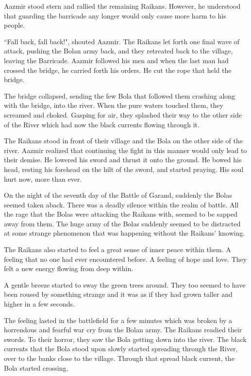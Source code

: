 \documentclass[twoside,11pt,titlepage]{article}
\begin{document}
Aazmir stood stern and rallied the remaining Raikans. However, he understood that guarding the barricade any longer would only cause more harm to his people.

``Fall back, fall back!", shouted Aazmir. The Raikans let forth one final wave of attack, pushing the Bolan army back, and they retreated back to the village, leaving the Barricade. Aazmir followed his men and when the last man had crossed the bridge, he carried forth his orders. He cut the rope that held the bridge.

The bridge collapsed, sending the few Bola that followed them crashing along with the bridge, into the river. When the pure waters touched them, they screamed and choked. Gasping for air, they splashed their way to the other side of the River which had now the black currents flowing through it.

The Raikans stood in front of their village and the Bola on the other side of the river. Aazmir realized that continuing the fight in this manner would only lead to their demise. He lowered his sword and thrust it onto the ground. He bowed his head, resting his forehead on the hilt of the sword, and started praying. His soul hurt now, more than ever.

On the night of the seventh day of the Battle of Garand, suddenly the Bolas seemed taken aback. There was a deadly silence within the realm of battle. All the rage that the Bolas were attacking the Raikans with, seemed to be sapped away from them. The huge army of the Bolas suddenly seemed to be distracted at some strange phenomenon that was happening without the Raikans' knowing.

The Raikans also started to feel a great sense of inner peace within them. A feeling that no one had ever encountered before. A feeling of hope and love. They felt a new energy flowing from deep within.

A gentle breeze started to sway the green trees around. They too seemed to have been roused by something strange and it was as if they had grown taller and higher in a few seconds.

The feeling lasted in the battlefield for a few minutes which was broken by a horrendous and fearful war cry from the Bolan army. The Raikans readied their swords. To their horror, they saw the Bola getting down into the river. The black currents that the Bola stood upon slowly started spreading through the River, over to the banks close to the village. Through that spread black current, the Bola started crossing.
\end{document}
